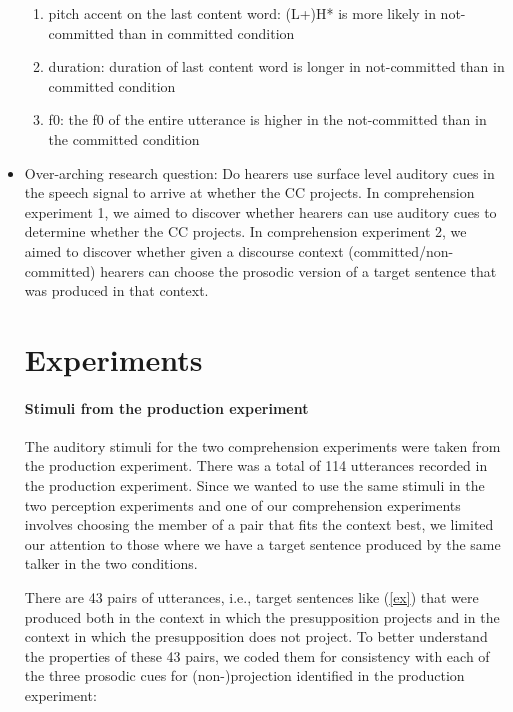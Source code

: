 \documentclass[dina4,12pt,fleqn]{article}
\newcommand{\6}{\mbox{$[\hspace*{-.6mm}[$}}
\newcommand{\9}{\mbox{$]\hspace*{-.6mm}]$}}
\begin{document}
\begin{itemize}[leftmargin=12pt]
\begin{enumerate}[noitemsep]

    \item pitch accent on the last content word: (L+)H* is more likely in not-committed than in committed condition
   
    \item duration: duration of last content word is longer in not-committed than in committed condition
    
    \item f0: the f0 of the entire utterance is higher in the not-committed than in the committed condition
    
\end{enumerate}

\item Over-arching research question: Do hearers use surface level auditory cues in the speech signal to arrive at whether the CC projects. In comprehension experiment 1, we aimed to discover whether hearers can use auditory cues to determine whether the CC projects. In comprehension experiment 2, we aimed to discover whether given a discourse context (committed/non-committed) hearers can choose the prosodic version of a target sentence that was produced in that context. 
\section{Experiments}

\paragraph{Stimuli from the production experiment}
The auditory stimuli for the two comprehension experiments were taken from the production experiment.  There was a total of 114 utterances recorded in the production experiment. Since we wanted to use the same stimuli in the two perception experiments and one of our comprehension experiments involves choosing the member of a pair that fits the context best, we limited our attention to those where we have a target sentence produced by the same talker in the two conditions.

There are 43 pairs of utterances, i.e., target sentences like (\ref{ex}) that were produced both in the context in which the presupposition projects and in the context in which the presupposition does not project. To better understand the properties of these 43 pairs, we coded them for consistency with each of the three prosodic cues for (non-)projection identified in the production experiment:


\end{itemize}
\end{document}
